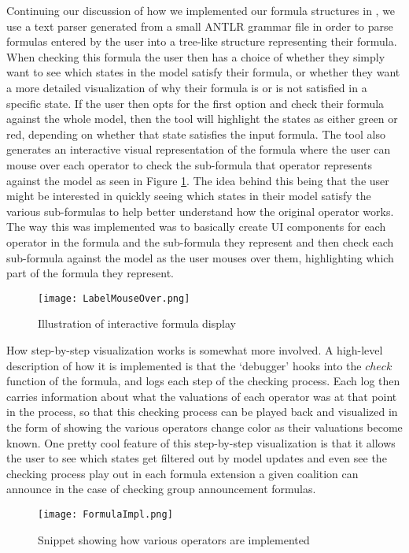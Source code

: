 Continuing our discussion of how we implemented our formula structures in \cname, we use a text parser generated from a small ANTLR grammar file in order to parse formulas entered by the user into a tree-like structure representing their formula. When checking this formula the user then has a choice of whether they simply want to see which states in the model satisfy their formula, or whether they want a more detailed visualization of why their formula is or is not satisfied in a specific state. If the user then opts for the first option and check their formula against the whole model, then the tool will highlight the states as either green or red, depending on whether that state satisfies the input formula. The tool also generates an interactive visual representation of the formula where the user can mouse over each operator to check the sub-formula that operator represents against the model as seen in Figure \ref{fig:labelHover}. The idea behind this being that the user might be interested in quickly seeing which states in their model satisfy the various sub-formulas to help better understand how the original operator works. The way this was implemented was to basically create UI components for each operator in the formula and the sub-formula they represent and then check each sub-formula against the model as the user mouses over them, highlighting which part of the formula they represent.

\begin{figure}[H]
	\label{fig:labelHover}
	\caption{Illustration of interactive formula display}
	\texttt{[image: LabelMouseOver.png]}
\end{figure}

How step-by-step visualization works is somewhat more involved. A high-level description of how it is implemented is that the `debugger' hooks into the $check$ function of the formula, and logs each step of the checking process. Each log then carries information about what the valuations of each operator was at that point in the process, so that this checking process can be played back and visualized in the form of showing the various operators change color as their valuations become known. One pretty cool feature of this step-by-step visualization is that it allows the user to see which states get filtered out by model updates and even see the checking process play out in each formula extension a given coalition can announce in the case of checking group announcement formulas. 

\begin{figure}[H]
	\label{fig:formulaImpl}
	\caption{Snippet showing how various operators are implemented}
	\texttt{[image: FormulaImpl.png]}
\end{figure}



